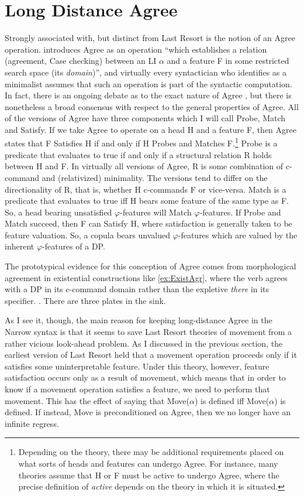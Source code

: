 \documentclass[MilwayThesis]{subfiles}
\begin{document}
\section{Long Distance Agree}
Strongly associated with, but distinct from Last Resort is the notion of an Agree operation.
\textcite[101]{chomsky2000minimalist} introduces Agree as an operation ``which establishes a relation (agreement, Case checking) between an LI $\alpha$ and a feature F in some restricted search space (its \textit{domain})'', and virtually every syntactician who identifies as a minimalist assumes that such an operation is part of the syntactic computation.
In fact, there is an ongoing debate as to the exact nature of Agree \parencite{zeijlstra2012there,preminger2013thats,bjorkman2014upward}, but there is nonetheless a broad consensus with respect to the general properties of Agree.
All of the versions of Agree have three components which I will call Probe, Match and Satisfy.
If we take Agree to operate on a head H and a feature F, then Agree states that F Satisfies H if and only if H Probes and Matches F.\footnote{
	Depending on the theory, there may be additional requirements placed on what sorts of heads and features can undergo Agree.
	For instance, many theories assume that H or F must be active to undergo Agree, where the precise definition of \textit{active} depends on the theory in which it is situated.  
}
Probe is a predicate that evaluates to true if and only if a structural relation R holds between H and F.
In virtually all versions of Agree, R is some combination of c-command and (relativized) minimality.
The versions tend to differ on the directionality of R, that is, whether H c-commands F or vice-versa.
Match is a predicate that evaluates to true iff H bears some feature of the same type as F.
So, a head bearing unsatisfied $\varphi$-features will Match $\varphi$-features.
If Probe and Match succeed, then F can Satisfy H, where satisfaction is generally taken to be feature valuation.
So, a copula bears unvalued $\varphi$-features which are valued by the inherent $\varphi$-features of a DP.

The prototypical evidence for this conception of Agree comes from morphological agreement in existential constructions like \cref{ex:ExistAgr}, where the verb agrees with a DP in its c-command domain rather than the expletive \textit{there} in its specifier.
\ex.\label{ex:ExistAgr} There are three plates in the sink.

As I see it, though, the main reason for keeping long-distance Agree in the Narrow syntax is that it seems to save Last Resort theories of movement from a rather vicious look-ahead problem.
As I discussed in the previous section, the earliest version of Last Resort held that a movement operation proceeds only if it satisfies some uninterpretable feature.
Under this theory, however, feature satisfaction occurs only as a result of movement, which means that in order to know if a movement operation satisfies a feature, we need to perform that movement.
This has the effect of saying that Move($\alpha$) is defined iff Move($\alpha$) is defined.
If instead, Move is preconditioned on Agree, then we no longer have an infinite regress.
\end{document}
